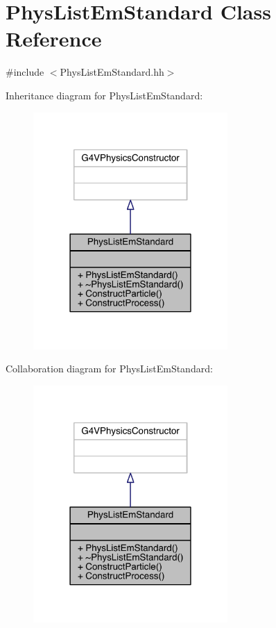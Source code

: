 \hypertarget{classPhysListEmStandard}{}\section{Phys\+List\+Em\+Standard Class Reference}
\label{classPhysListEmStandard}


{\ttfamily \#include $<$Phys\+List\+Em\+Standard.\+hh$>$}



Inheritance diagram for Phys\+List\+Em\+Standard\+:
\nopagebreak
\begin{figure}[H]
\begin{center}
\leavevmode
\includegraphics[width=210pt]{classPhysListEmStandard__inherit__graph}
\end{center}
\end{figure}


Collaboration diagram for Phys\+List\+Em\+Standard\+:
\nopagebreak
\begin{figure}[H]
\begin{center}
\leavevmode
\includegraphics[width=210pt]{classPhysListEmStandard__coll__graph}
\end{center}
\end{figure}
